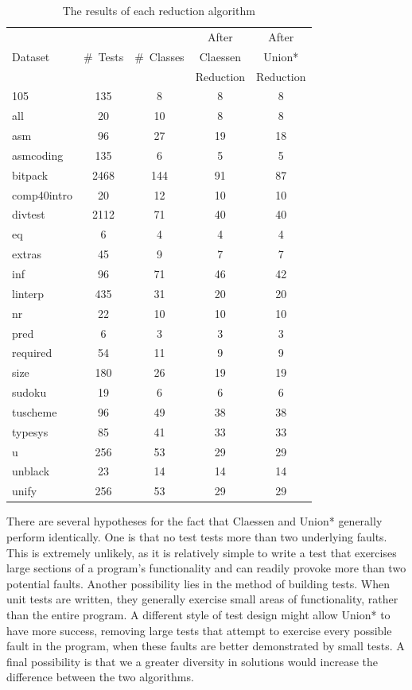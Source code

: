 \documentclass[11pt,twoside]{article}
\theoremstyle{definition}
\begin{document}
\begin{table}[t]
\def\?{\phantom0}
\centering

\begin{tabular}{ | l | c | c | c | c | }
\hline
        &          &             &   After   & After \\ 
Dataset & \#~Tests & \#\ Classes &  Claessen &  Union*  \\ 
     &            &             & Reduction & Reduction \\
\hline
105 & \?135 & \?\?8 & \?8 & \?8 \\
all & \?\?20 & \?10 & \?8 & \?8 \\
asm & \?\?96 & \?27 & 19 & 18 \\
asmcoding & \?135 & \?\?6 & \?5 & \?5 \\
bitpack & 2468 & 144 & 91 & 87 \\
comp40intro & \?\?20 & \?12 & 10 & 10 \\
divtest & 2112 & \?71 & 40 & 40 \\
eq & \?\?\?6 & \?\?4 & \?4 & \?4 \\
extras & \?\?45 & \?\?9 & \?7 & \?7 \\
inf & \?\?96 & \?71 & 46 & 42 \\
linterp & \?435 & \?31 & 20 & 20 \\
nr & \?\?22 & \?10 & 10 & 10 \\
pred & \?\?\?6 & \?\?3 & \?3 & \?3 \\
required & \?\?54 & \?11 & \?9 & \?9 \\
size & \?180 & \?26 & 19 & 19 \\
sudoku & \?19 & \?\?6 & \?6 & \?6 \\
tuscheme & \?\?96 & \?49 & 38 & 38 \\
typesys & \?\?85 & \?41 & 33 & 33 \\
u & \?256 & \?53 & 29 & 29 \\
unblack & \?23 & \?14 & 14 & 14 \\
unify & \?256 & \?53 & 29 & 29 \\
\hline
\end{tabular}
\caption{The results of each reduction algorithm}
\end{table}

There are several hypotheses for the fact that Claessen and Union* generally perform identically. One is that no test tests more than two underlying faults. This is extremely unlikely, as it is relatively simple to write a test that exercises large sections of a program's functionality and can readily provoke more than two potential faults. Another possibility lies in the method of building tests. When unit tests are written, they generally exercise small areas of functionality, rather than the entire program. A different style of test design might allow Union* to have more success, removing large tests that attempt to exercise every possible fault in the program, when these faults are better demonstrated by small tests. A final possibility is that we a greater diversity in solutions would increase the difference between the two algorithms.
\end{document}
